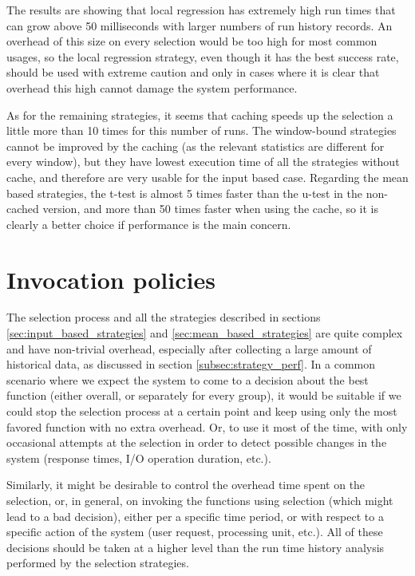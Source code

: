 The results are showing that local regression has extremely high run times that can grow above 50 milliseconds with larger numbers of run history records. An overhead of this size on every selection would be too high for most common usages, so the local regression strategy, even though it has the best success rate, should be used with extreme caution and only in cases where it is clear that overhead this high cannot damage the system performance. 

As for the remaining strategies, it seems that caching speeds up the selection a little more than 10 times for this number of runs. The window-bound strategies cannot be improved by the caching (as the relevant statistics are different for every window), but they have lowest execution time of all the strategies without cache, and therefore are very usable for the input based case. Regarding the mean based strategies, the t-test is almost 5 times faster than the u-test in the non-cached version, and more than 50 times faster when using the cache, so it is clearly a better choice if performance is the main concern.

\section{Invocation policies}
\label{sec:policies}

The selection process and all the strategies described in sections \ref{sec:input_based_strategies} and \ref{sec:mean_based_strategies} are quite complex and have non-trivial overhead, especially after collecting a large amount of historical data, as discussed in section \ref{subsec:strategy_perf}. In a common scenario where we expect the system to come to a decision about the best function (either overall, or separately for every group), it would be suitable if we could stop the selection process at a certain point and keep using only the most favored function with no extra overhead. Or, to use it most of the time, with only occasional attempts at the selection in order to detect possible changes in the system (response times, I/O operation duration, etc.).

Similarly, it might be desirable to control the overhead time spent on the selection, or, in general, on invoking the functions using selection (which might lead to a bad decision), either per a specific time period, or with respect to a specific action of the system (user request, processing unit, etc.). All of these decisions should be taken at a higher level than the run time history analysis performed by the selection strategies.  

